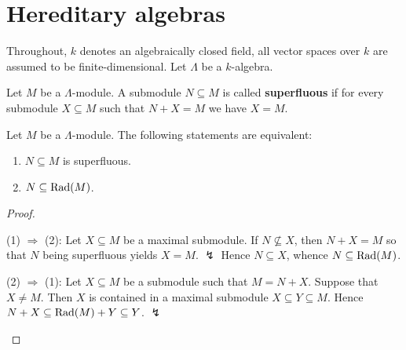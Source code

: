 %




\section{Hereditary algebras}



Throughout, $k$ denotes an algebraically closed field, all vector spaces over $k$ are assumed to be finite-dimensional. Let $\Lambda$ be a $k$-algebra.


\begin{definition}
Let $M$ be a $\Lambda$-module. A submodule $N\subseteq M$ is called \textbf{superfluous} if for every submodule $X\subseteq M$ such that $N+X=M$ we have $X=M$. 
\end{definition}


\begin{lemma}\label{3.6.1}
Let $M$ be a $\Lambda$-module. The following statements are equivalent:
\begin{enumerate}
\item $N\subseteq M$ is superfluous.
\item $N\subseteq \operatorname{Rad}(M)$.
\end{enumerate}
\end{lemma}


\begin{proof}\
\begin{addmargin}[1cm]{0cm}
\hspace{-1cm}(1) $\Rightarrow$ (2): Let $X\subseteq M$ be a maximal submodule. If $N\not\subseteq X$, then $N+X=M$ so that $N$ being superfluous yields $X=M$. $\lightning$ Hence $N\subseteq X$, whence $N\subseteq \operatorname{Rad}(M)$.

\hspace{-1cm}(2) $\Rightarrow$ (1): Let $X\subseteq M$ be a submodule such that $M=N+X$. Suppose that $X\neq M$. Then $X$ is contained in a maximal submodule $X\subseteq Y\subseteq M$. Hence $N+X\subseteq \operatorname{Rad}(M)+Y\subseteq Y$. $\lightning$ \qedhere
\end{addmargin}
\end{proof}

